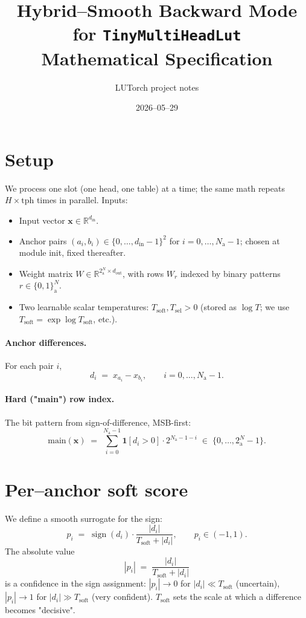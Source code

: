 \documentclass[11pt]{article}
\title{Hybrid--Smooth Backward Mode for \texttt{TinyMultiHeadLut}\\
\large Mathematical Specification}
\author{LUTorch project notes}
\date{2026--05--29}
\newcommand{\NAP}{N_{\!\text{a}}}
\newcommand{\Tsoft}{T_{\!\text{soft}}}
\newcommand{\Tsel}{T_{\!\text{sel}}}
\begin{document}
\maketitle

\section{Setup}

We process one slot (one head, one table) at a time; the same math repeats
$H \times \text{tph}$ times in parallel. Inputs:
\begin{itemize}
  \item Input vector $\bm{x} \in \mathbb{R}^{d_{\text{in}}}$.
  \item Anchor pairs $(a_i, b_i) \in \{0, \dots, d_{\text{in}}{-}1\}^2$ for
        $i = 0, \dots, \NAP{-}1$; chosen at module init, fixed thereafter.
  \item Weight matrix $W \in \mathbb{R}^{2^\NAP \times d_{\text{out}}}$, with
        rows $W_r$ indexed by binary patterns $r \in \{0,1\}^\NAP$.
  \item Two learnable scalar temperatures: $\Tsoft, \Tsel > 0$
        (stored as $\log T$; we use $\Tsoft = \exp \log T_{\!\text{soft}}$, etc.).
\end{itemize}

\paragraph{Anchor differences.} For each pair $i$,
\begin{equation}
  d_i \;=\; x_{a_i} - x_{b_i}, \qquad i = 0, \dots, \NAP{-}1.
\end{equation}

\paragraph{Hard ("main") row index.} The bit pattern from sign-of-difference,
MSB-first:
\begin{equation}
  \text{main}(\bm{x}) \;=\; \sum_{i=0}^{\NAP-1} \mathbf{1}[d_i > 0] \cdot 2^{\NAP-1-i}
  \;\in\; \{0, \dots, 2^\NAP-1\}.
\end{equation}

\section{Per--anchor soft score}

We define a smooth surrogate for the sign:
\begin{equation}
  p_i \;=\; \operatorname{sign}(d_i) \cdot \frac{|d_i|}{\Tsoft + |d_i|},
  \qquad p_i \in (-1, 1).
\end{equation}
The absolute value
\begin{equation}
  |p_i| \;=\; \frac{|d_i|}{\Tsoft + |d_i|}
\end{equation}
is a confidence in the sign assignment: $|p_i| \to 0$ for $|d_i| \ll \Tsoft$
(uncertain), $|p_i| \to 1$ for $|d_i| \gg \Tsoft$ (very confident).
$\Tsoft$ sets the scale at which a difference becomes "decisive".
\end{document}
